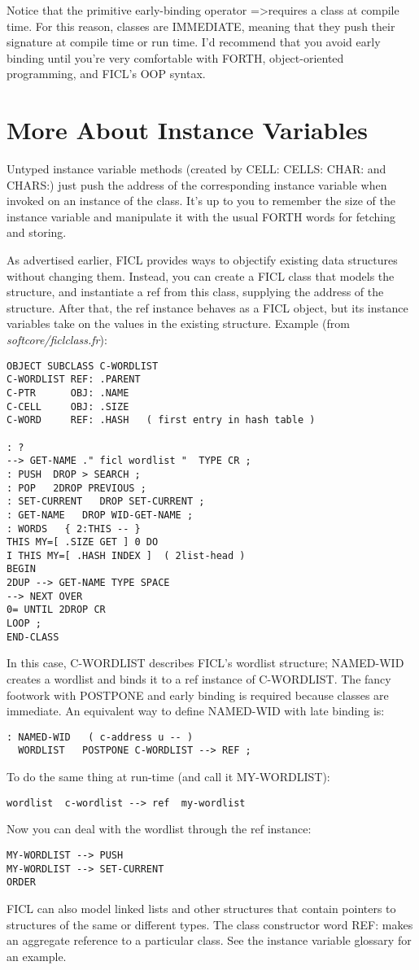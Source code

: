 \begin{;stlisting}[frame=single]
Notice that the primitive early-binding operator =\textgreater requires
a class at compile time. For this reason, classes are IMMEDIATE, meaning
that they push their signature at compile time or run time. I'd
recommend that you avoid early binding until you're very comfortable
with FORTH, object-oriented programming, and FICL's OOP syntax.


\section{More About Instance Variables}
Untyped instance variable methods (created by CELL: CELLS: CHAR: and
CHARS:) just push the address of the corresponding instance variable
when invoked on an instance of the class. It's up to you to remember the
size of the instance variable and manipulate it with the usual FORTH
words for fetching and storing.

As advertised earlier, FICL provides ways to objectify existing data
structures without changing them. Instead, you can create a FICL class
that models the structure, and instantiate a ref from this class,
supplying the address of the structure. After that, the ref instance
behaves as a FICL object, but its instance variables take on the values
in the existing structure. Example (from \textit{softcore/ficlclass.fr}):
\begin{lstlisting}[frame=single]
OBJECT SUBCLASS C-WORDLIST
C-WORDLIST REF: .PARENT
C-PTR      OBJ: .NAME
C-CELL     OBJ: .SIZE
C-WORD     REF: .HASH   ( first entry in hash table )

: ?
--> GET-NAME ." ficl wordlist "  TYPE CR ;
: PUSH  DROP > SEARCH ;
: POP   2DROP PREVIOUS ;
: SET-CURRENT   DROP SET-CURRENT ;
: GET-NAME   DROP WID-GET-NAME ;
: WORDS   { 2:THIS -- }
THIS MY=[ .SIZE GET ] 0 DO 
I THIS MY=[ .HASH INDEX ]  ( 2list-head )
BEGIN
2DUP --> GET-NAME TYPE SPACE
--> NEXT OVER
0= UNTIL 2DROP CR
LOOP ;
END-CLASS
\end{lstlisting}
In this case, C-WORDLIST describes FICL's wordlist structure; NAMED-WID
creates a wordlist and binds it to a ref instance of C-WORDLIST. The
fancy footwork with POSTPONE and early binding is required because
classes are immediate. An equivalent way to define NAMED-WID with late
binding is:
\begin{lstlisting}[frame=single]
: NAMED-WID   ( c-address u -- )
  WORDLIST   POSTPONE C-WORDLIST --> REF ;
\end{lstlisting}
To do the same thing at run-time (and call it MY-WORDLIST):
\begin{lstlisting}[frame=single]
wordlist  c-wordlist --> ref  my-wordlist
\end{lstlisting}
Now you can deal with the wordlist through the ref instance:
\begin{lstlisting}[frame=single]
MY-WORDLIST --> PUSH
MY-WORDLIST --> SET-CURRENT
ORDER
\end{lstlisting}
FICL can also model linked lists and other structures that contain
pointers to structures of the same or different types. The class
constructor word REF: makes an aggregate reference to a particular
class. See the instance variable glossary for an example.


\end{;stlisting}
